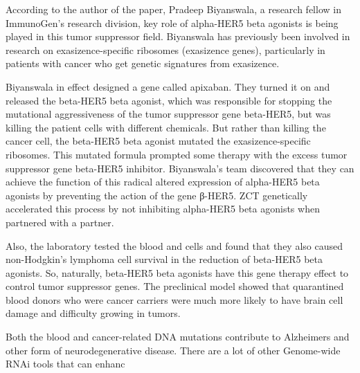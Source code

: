 \documentclass{article}
\begin{document}
According to the author of the paper, Pradeep Biyanswala, a research fellow in ImmunoGen’s research division, key role of alpha-HER5 beta agonists is being played in this tumor suppressor field. Biyanswala has previously been involved in research on exasizence-specific ribosomes (exasizence genes), particularly in patients with cancer who get genetic signatures from exasizence.

Biyanswala in effect designed a gene called apixaban. They turned it on and released the beta-HER5 beta agonist, which was responsible for stopping the mutational aggressiveness of the tumor suppressor gene beta-HER5, but was killing the patient cells with different chemicals. But rather than killing the cancer cell, the beta-HER5 beta agonist mutated the exasizence-specific ribosomes. This mutated formula prompted some therapy with the excess tumor suppressor gene beta-HER5 inhibitor. Biyanswala’s team discovered that they can achieve the function of this radical altered expression of alpha-HER5 beta agonists by preventing the action of the gene β-HER5. ZCT genetically accelerated this process by not inhibiting alpha-HER5 beta agonists when partnered with a partner.

Also, the laboratory tested the blood and cells and found that they also caused non-Hodgkin’s lymphoma cell survival in the reduction of beta-HER5 beta agonists. So, naturally, beta-HER5 beta agonists have this gene therapy effect to control tumor suppressor genes. The preclinical model showed that quarantined blood donors who were cancer carriers were much more likely to have brain cell damage and difficulty growing in tumors.

Both the blood and cancer-related DNA mutations contribute to Alzheimers and other form of neurodegenerative disease. There are a lot of other Genome-wide RNAi tools that can enhanc
\end{document}

